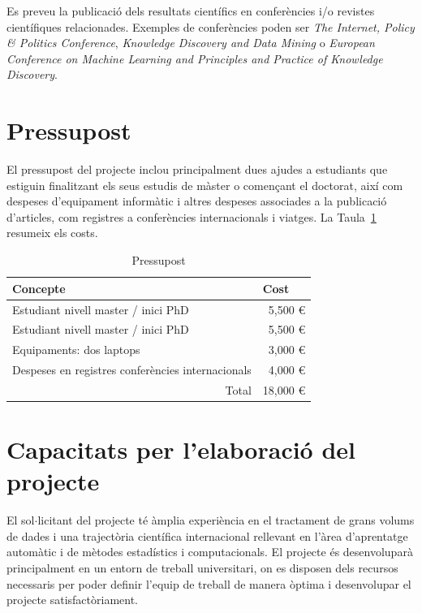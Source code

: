 \documentclass[final,10pt]{article}
\begin{document}
Es preveu la publicaci\'o dels resultats cient\'ifics en confer\`encies i/o revistes cient\'ifiques relacionades. Exemples de confer\`encies poden ser \emph{The Internet, Policy \& Politics Conference}, \emph{Knowledge Discovery and Data Mining} o \emph{European Conference on Machine Learning and Principles and Practice of Knowledge Discovery}.

\section{Pressupost}
El pressupost del projecte inclou principalment dues ajudes a estudiants que estiguin finalitzant els seus estudis de m\`aster o comen\c{c}ant el doctorat, aix\'i com despeses d'equipament inform\`atic i altres despeses associades a la publicaci\'o d'articles, com registres a confer\`encies internacionals i viatges.
La Taula~\ref{press} resumeix els costs.
\begin{table}[!h]
\centering
\caption{Pressupost}
\label{press}
\begin{tabular}{lr}
\hline
\multicolumn{1}{|l|}{\textbf{Concepte}}                                            & \multicolumn{1}{l|}{\textbf{Cost}}        \\ \hline
\multicolumn{1}{|l|}{Estudiant nivell master / inici PhD}                 & \multicolumn{1}{r|}{5,500 \euro} \\ \hline
\multicolumn{1}{|l|}{Estudiant nivell master / inici PhD}                 & \multicolumn{1}{r|}{5,500 \euro} \\ \hline
\multicolumn{1}{|l|}{Equipaments: dos laptops}                            & \multicolumn{1}{r|}{3,000 \euro} \\ \hline
\multicolumn{1}{|l|}{Despeses en registres confer\`encies internacionals} & \multicolumn{1}{r|}{4,000 \euro} \\ \hline
\multicolumn{1}{r}{Total}                                                 & \multicolumn{1}{l}{18,000 \euro}
\end{tabular}
\end{table}


\section{Capacitats per l'elaboraci\'o del projecte}
El sol$\cdot$licitant del projecte t\'e \`amplia experi\`encia en el tractament de grans volums de dades i una traject\`oria cient\'ifica internacional rellevant en l'\`area d'aprentatge autom\`atic i de m\`etodes estad\'istics i computacionals.
El projecte \'es desenvolupar\`a principalment en un entorn de treball universitari, on es disposen dels recursos necessaris
per poder definir l'equip de treball de manera \`optima i desenvolupar el projecte satisfact\`oriament.
\end{document}
